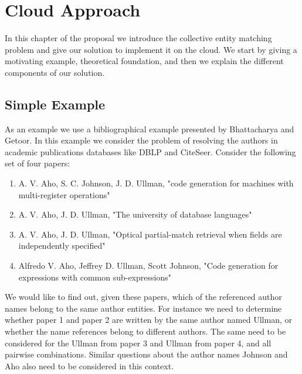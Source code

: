 \chapter {Cloud Approach}
In this chapter of the proposal we introduce the collective entity matching problem and give our solution to implement it on the cloud. We start by giving a motivating example, theoretical foundation, and then we explain the different components of our solution.

\section{Simple Example}
As an example we use a bibliographical example presented by Bhattacharya and Getoor\cite{BhGe06b}. In this example we consider the problem of resolving the authors in academic publications databases like DBLP and CiteSeer. Consider the following set of four papers:

\begin{enumerate}
\item A. V. Aho, S. C. Johnson, J. D. Ullman, "code generation for machines with multi-register operations"
\item A. V. Aho, J. D. Ullman, "The university of database languages"
\item A. V. Aho, J. D. Ullman, "Optical partial-match retrieval when fields are independently specified"
\item Alfredo V. Aho, Jeffrey D. Ullman, Scott Johnson, "Code generation for expressions with common sub-expressions"
\end{enumerate}

We would like to find out, given these papers, which of the referenced author names belong to the same author entities. For instance we need to determine whether paper 1 and paper 2 are written by the same author named Ullman, or whether the name references belong to different authors. The same need to be considered for the Ullman from paper 3 and Ullman from paper 4, and all pairwise combinations. Similar questions about the author names Johnson and Aho also need to be considered in this context. 

